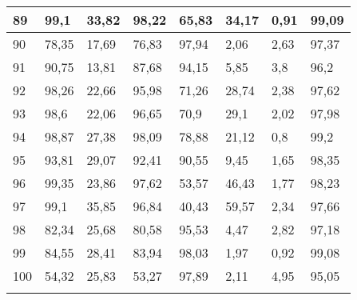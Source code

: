\begin{longtable}[c]{|l|l|l|l|l|l|l|l|}
89              & 99,1         & 33,82        & 98,22       & 65,83         & 34,17         & 0,91          & 99,09         \\ \hline
90              & 78,35        & 17,69        & 76,83       & 97,94         & 2,06          & 2,63          & 97,37         \\ \hline
91              & 90,75        & 13,81        & 87,68       & 94,15         & 5,85          & 3,8           & 96,2          \\ \hline
92              & 98,26        & 22,66        & 95,98       & 71,26         & 28,74         & 2,38          & 97,62         \\ \hline
93              & 98,6         & 22,06        & 96,65       & 70,9          & 29,1          & 2,02          & 97,98         \\ \hline
94              & 98,87        & 27,38        & 98,09       & 78,88         & 21,12         & 0,8           & 99,2          \\ \hline
95              & 93,81        & 29,07        & 92,41       & 90,55         & 9,45          & 1,65          & 98,35         \\ \hline
96              & 99,35        & 23,86        & 97,62       & 53,57         & 46,43         & 1,77          & 98,23         \\ \hline
97              & 99,1         & 35,85        & 96,84       & 40,43         & 59,57         & 2,34          & 97,66         \\ \hline
98              & 82,34        & 25,68        & 80,58       & 95,53         & 4,47          & 2,82          & 97,18         \\ \hline
99              & 84,55        & 28,41        & 83,94       & 98,03         & 1,97          & 0,92          & 99,08         \\ \hline
100             & 54,32        & 25,83        & 53,27       & 97,89         & 2,11          & 4,95          & 95,05         \\ \hline
\label{anx:suavidad}
\end{longtable}
